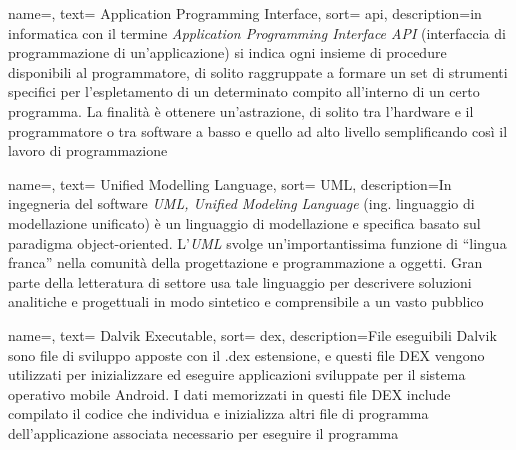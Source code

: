 \renewcommand{\acronymname}{Acronimi e abbreviazioni}

{
name=,
text= Application Programming Interface,
sort= api,
description={in informatica con il termine \emph{Application Programming Interface API} (interfaccia di programmazione di un'applicazione) si indica ogni insieme di procedure disponibili al programmatore, di solito raggruppate a formare un set di strumenti specifici per l'espletamento di un determinato compito all'interno di un certo programma.
La finalità è ottenere un'astrazione, di solito tra l'hardware e il programmatore o tra software a basso e quello ad alto livello semplificando così il lavoro di programmazione}
}

{
name=,
text= Unified Modelling Language,
sort= UML,
description={In ingegneria del software \emph{UML, Unified Modeling Language} (ing. linguaggio di modellazione unificato) è un linguaggio di modellazione e specifica basato sul paradigma object-oriented. L'\emph{UML} svolge un'importantissima funzione di ``lingua franca'' nella comunità della progettazione e programmazione a oggetti. Gran parte della letteratura di settore usa tale linguaggio per descrivere soluzioni analitiche e progettuali in modo sintetico e comprensibile a un vasto pubblico}
}


{
name=,
text= Dalvik Executable,
sort= dex,
description={File eseguibili Dalvik sono file di sviluppo apposte con il .dex estensione, e questi file DEX vengono utilizzati per inizializzare ed eseguire applicazioni sviluppate per il sistema operativo mobile Android.
I dati memorizzati in questi file DEX include compilato il codice che individua e inizializza altri file di programma dell'applicazione associata necessario per eseguire il programma}
}

